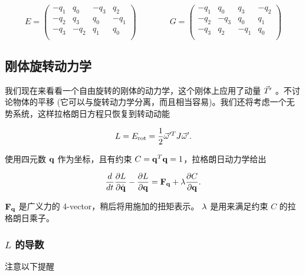 \begin{equation*}
E =
\left( \begin{array}{cccc}
-q_1 &  q_0 & -q_3 & q_2  \\
-q_2 &  q_3 & q_0  & -q_1 \\
-q_3 & -q_2 & q_1  & q_0  \\
\end{array} \right)
\qquad \qquad
G = 
\left( \begin{array}{cccc}
-q_1 &  q_0 & q_3 & -q_2 \\
-q_2 & -q_3 & q_0  & q_1 \\
-q_3 & q_2 & -q_1  & q_0 \\
\end{array} \right)
\end{equation*}







\subsection{刚体旋转动力学}
\label{quat_rigid_dyn_IN}

我们现在来看看一个自由旋转的刚体的动力学，这个刚体上应用了动量 $\vec T'$ 。不讨论物体的平移 (它可以与旋转动力学分离，而且相当容易)。我们还将考虑一个无势系统，这样拉格朗日方程只恢复到转动动能

\begin{equation}
L=E_{\textrm{rot}}=\frac{1}{2}\vec{\omega}'^TJ\vec{\omega}'.
\end{equation}

使用四元数 $\mathbf{q}$ 作为坐标，且有约束 $C=\mathbf{q}^T\mathbf{q}=1$，拉格朗日动力学给出

\begin{equation}
\frac{d}{dt}\frac{\partial L}{\partial \dot{\mathbf{q}}} - \frac{\partial L}{\partial \mathbf{q}} = \mathbf{F_q} + {\lambda} \frac{\partial C}{\partial \mathbf{q}}.
\label{eqLDyn}
\end{equation}

$\mathbf{F_q}$ 是广义力的 4-vector，稍后将用施加的扭矩表示。 $\mathbf{\lambda}$ 是用来满足约束 $C$ 的拉格朗日乘子。

\subsubsection{$L$ 的导数}

注意以下提醒

